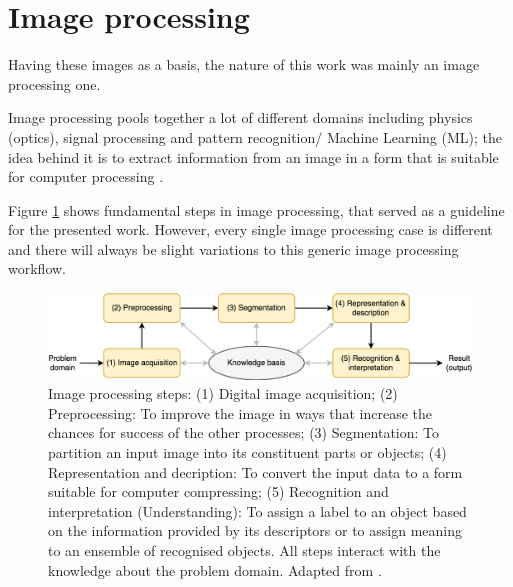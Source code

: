 \section{Image processing}

Having these images as a basis, the nature of this work was mainly an image processing one.

Image processing pools together a lot of different domains including physics (optics), signal processing and pattern recognition/ Machine Learning (ML); %
the idea behind it is to extract information from an image in a form that is suitable for computer processing \cite{pydata2018}. 

Figure \ref{fig:imageprocessingWorkflow} shows fundamental steps in image processing, that served as a guideline for the presented work. However, every single image processing case is different and there will always be slight variations to this generic image processing workflow.




\begin{figure}[H]
	\centering
	\includegraphics[width=\textwidth]{../Figures/imageprocessing.png}
	\caption{Image processing steps: (1) Digital image acquisition; (2) Preprocessing: To improve the image in ways that increase the chances for success of the other processes; (3) Segmentation: To partition an input image into its constituent parts or objects; (4) Representation and decription: To convert the input data to a form suitable for computer compressing; %
	(5) Recognition and interpretation (Understanding): To assign a label to an object based on the information provided by its descriptors or to assign meaning to an ensemble of recognised objects. All steps interact with the knowledge about the problem domain. 
		Adapted from \cite{imagProcFundamentals}.}
	\label{fig:imageprocessingWorkflow}
\end{figure}



